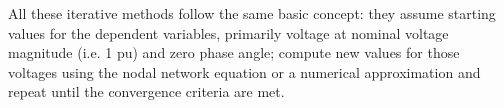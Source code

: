 All these iterative methods follow the same basic concept: they assume starting values for the dependent variables, primarily voltage at nominal voltage magnitude (i.e. 1 \gls{pu}) and zero phase angle; compute new values for those voltages using the nodal network equation or a numerical approximation and repeat until the convergence criteria are met.

    
    
    
    

